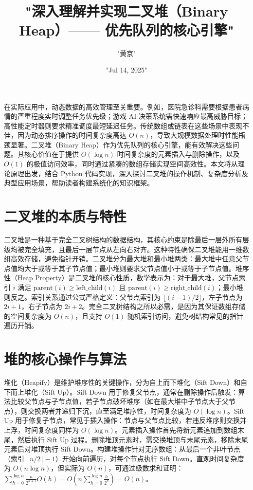 \title{"深入理解并实现二叉堆（Binary Heap）—— 优先队列的核心引擎"}
\author{"黄京"}
\date{"Jul 14, 2025"}
\maketitle
在实际应用中，动态数据的高效管理至关重要。例如，医院急诊科需要根据患者病情的严重程度实时调整任务优先级；游戏 AI 决策系统需快速响应最高威胁目标；高性能定时器则要求精准调度最短延迟任务。传统数组或链表在这些场景中表现不佳，因为动态排序操作的时间复杂度高达 $O(n)$，导致大规模数据处理时性能瓶颈显著。二叉堆（Binary Heap）作为优先队列的核心引擎，能有效解决这些问题。其核心价值在于提供 $O(\log n)$ 时间复杂度的元素插入与删除操作，以及 $O(1)$ 的极值访问效率，同时通过紧凑的数组存储实现空间高效性。本文将从理论原理出发，结合 Python 代码实现，深入探讨二叉堆的操作机制、复杂度分析及典型应用场景，帮助读者构建系统化的知识框架。\par
\chapter{二叉堆的本质与特性}
二叉堆是一种基于完全二叉树结构的数据结构，其核心约束是除最后一层外所有层级均被完全填充，且最后一层节点从左向右对齐。这种特性确保二叉堆能用一维数组高效存储，避免指针开销。二叉堆分为最大堆和最小堆两类：最大堆中任意父节点值均大于或等于其子节点值；最小堆则要求父节点值小于或等于子节点值。堆序性（Heap Property）是二叉堆的核心性质，数学表示为：对于最大堆，父节点索引 $i$ 满足 $\text{parent}(i) \geq \text{left\_child}(i)$ 且 $\text{parent}(i) \geq \text{right\_child}(i)$；最小堆则反之。索引关系通过公式严格定义：父节点索引为 $\lfloor (i-1)/2 \rfloor$，左子节点为 $2i + 1$，右子节点为 $2i + 2$。完全二叉树结构之所以必需，是因为其保证数组存储的空间复杂度为 $O(n)$，且支持 $O(1)$ 随机索引访问，避免树结构常见的指针遍历开销。\par
\chapter{堆的核心操作与算法}
堆化（Heapify）是维护堆序性的关键操作，分为自上而下堆化（Sift Down）和自下而上堆化（Sift Up）。Sift Down 用于修复父节点，通常在删除操作后触发：算法比较父节点与子节点值，若子节点破坏堆序（如在最大堆中子节点大于父节点），则交换两者并递归下沉，直至满足堆序性，时间复杂度为 $O(\log n)$。Sift Up 用于修复子节点，常见于插入操作：节点与父节点比较，若违反堆序则交换并上浮，时间复杂度同样为 $O(\log n)$。元素插入操作首先将新元素追加到数组末尾，然后执行 Sift Up 过程。删除堆顶元素时，需交换堆顶与末尾元素，移除末尾元素后对堆顶执行 Sift Down。构建堆操作针对无序数组：从最后一个非叶节点（索引 $\lfloor n/2 \rfloor - 1$）开始向前遍历，对每个节点执行 Sift Down。直观时间复杂度为 $O(n \log n)$，但实际为 $O(n)$，可通过级数求和证明：$\sum_{h=0}^{\log n} \frac{n}{2^{h+1}} O(h) = O(n \sum_{h=0}^{\log n} \frac{h}{2^h}) = O(n)$。\par
